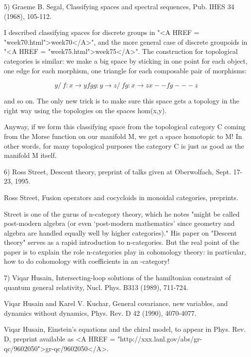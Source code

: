 5) Graeme B. Segal, Classifying spaces and spectral sequences, Pub. IHES 34
(1968), 105-112.  

I described classifying spaces for discrete groups in "<A HREF = "week70.html">week70</A>", and the
more general case of discrete groupoids in "<A HREF = "week75.html">week75</A>".  The construction
for topological categories is similar: we make a big space by sticking
in one point for each object, one edge for each morphism, one triangle
for each composable pair of morphisms:

$$
      y
     / \                       f: x \to  y
    f   g                      g: y \to  z
   /     \                    fg: x \to  z
  x--fg---z

$$
    
and so on.  The only new trick is to make sure this space gets a
topology in the right way using the topologies on the spaces hom(x,y).  

Anyway, if we form this classifying space from the topological
category C coming from the Morse function on our manifold M, we get a
space homotopic to M!  In other words, for many topological purposes the
category C is just as good as the manifold M itself.

6) Ross Street, Descent theory, preprint of talks given at Oberwolfach,
Sept. 17-23, 1995.  

Ross Street, Fusion operators and cocycloids in monoidal categories, 
preprints.

Street is one of the gurus of n-category theory, which he notes "might
be called post-modern algebra (or even `post-modern mathematics' since
geometry and algebra are handled equally well by higher categories)."
His paper on "Descent theory" serves as a rapid introduction to
n-categories.  But the real point of the paper is to explain the role
n-categories play in cohomology theory: in particular, how to do
cohomology with coefficients in an \omega -category!

7) Viqar Husain, Intersecting-loop solutions of the hamiltonian constraint
of quantum general relativity, Nucl. Phys. B313 (1989), 711-724.

Viqar Husain and Karel V. Kuchar, General covariance, new variables,
and dynamics without dynamics, Phys. Rev. D 42 (1990), 4070-4077.

Viqar Husain, Einstein's equations and the chiral model, to appear in
Phys. Rev. D, preprint available as <A HREF = "http://xxx.lanl.gov/abs/gr-qc/9602050">gr-qc/9602050</A>.

